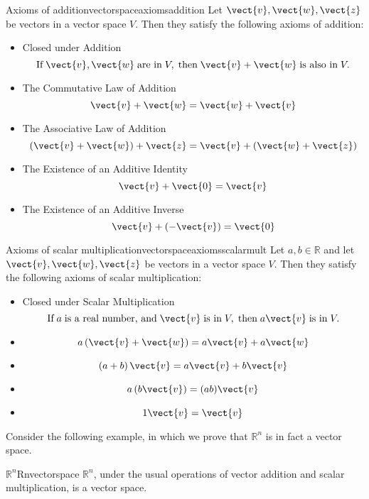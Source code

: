 \begin{definition}{Axioms of addition}{vectorspaceaxiomsaddition}
Let $\vect{v}, \vect{w}, \vect{z}$ be vectors in a vector space $V$. Then they satisfy the following axioms of addition:

\begin{itemize}
\item Closed under Addition
\[ \mbox{If}\; \vect{v}, \vect{w} \;\mbox{are in}\; V, \;\mbox{then}\; \vect{v}+\vect{w} \;\mbox{is also in}\; V.
\] 
\item The Commutative Law of Addition
\[
\vect{v}+\vect{w}=\vect{w}+\vect{v}
\]
\item The Associative Law of Addition
\[
\left( \vect{v}+\vect{w}\right) +\vect{z}=\vect{v}+\left( \vect{w}+
\vect{z}\right) 
\]
\item The Existence of an Additive Identity
\[
\vect{v}+\vect{0}=\vect{v}
\]
\item The Existence of an Additive Inverse
\[
\vect{v}+\left( -\vect{v}\right) =\vect{0}
\]
\end{itemize}
\end{definition}

\begin{definition}{Axioms of scalar multiplication}{vectorspaceaxiomsscalarmult}
Let $a, b \in \mathbb{R}$ and let $\vect{v}, \vect{w}, \vect{z}$ be vectors in a vector space $V$. Then they satisfy the following axioms of scalar multiplication:

\begin{itemize}
\item Closed under Scalar Multiplication
\[ \mbox{If}\; a \;\mbox{is a real number, and}\; \vect{v} \;\mbox{is in}\; V, \;\mbox{then}\; a\vect{v} \;\mbox{is in}\; V.
\]
\item
\[
a \left( \vect{v}+\vect{w}\right) = a \vect{v}+ a \vect{w}  \label{e.01}
\]
\item
\[
\left( a + b \right) \vect{v}= a \vect{v}+ b \vect{v}
\label{e.02}
\]
\item
\[
a \left( b \vect{v}\right) = (a b) \vect{v}
\label{e.03}
\]
\item
\[
1\vect{v}=\vect{v}  \label{e.04}
\]
\end{itemize}
\end{definition}

Consider the following example, in which we prove that $\mathbb{R}^n$ is in fact a vector space.

\begin{example}{$\mathbb{R}^n$}{Rnvectorspace}
$\mathbb{R}^n$, under the usual operations of vector addition and scalar multiplication, is a vector space.
\end{example}


